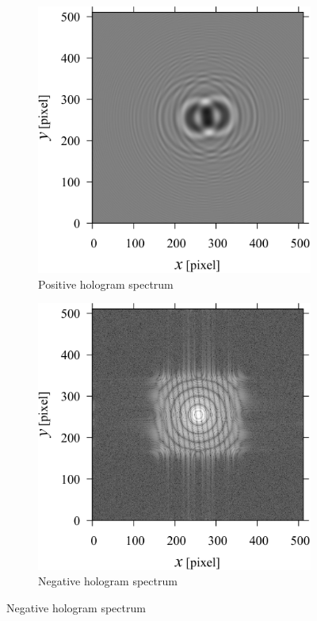 \begin{figure}[H]
    \begin{subfigure}[t]{0.45\linewidth}
        \includegraphics[width=\linewidth]{./Figure/7_Appendix/data/holonum.pdf}
        \caption{Positive hologram spectrum}
        \label{fig:appendixBresult:numholo}
    \end{subfigure}
    \hfill
    \begin{subfigure}[t]{0.45\linewidth}
        \includegraphics[width=\linewidth]{./Figure/7_Appendix/data/fftnum.pdf}
        \caption{Negative hologram spectrum}
        \label{fig:appendixBresult:numfft}
    \end{subfigure}


\end{figure}
